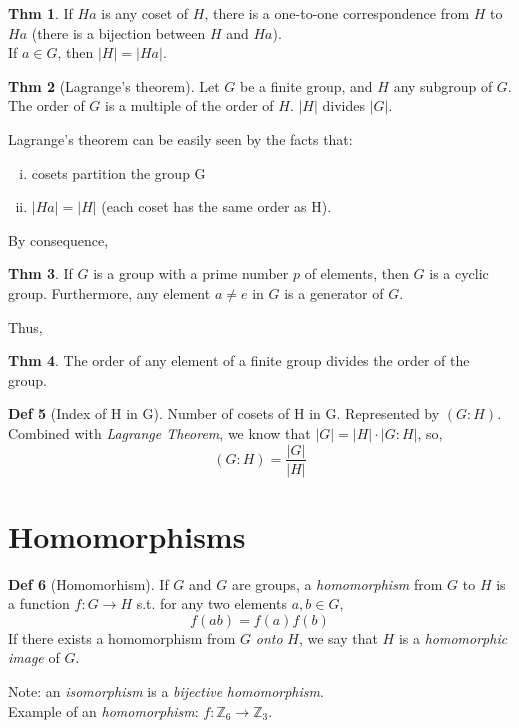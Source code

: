 \documentclass{article}
\theoremstyle{definition}
\newtheorem{definition}{Def}[section]
\newtheorem{theorem}[definition]{Thm}
\begin{document}
\begin{theorem}
    If $Ha$ is any coset of $H$, there is a one-to-one correspondence from $H$ to $Ha$ (there is a bijection between $H$ and $Ha$).\\
    If $a \in G$, then $|H| = |Ha|$.
\end{theorem}

\begin{theorem}[Lagrange's theorem]
    Let $G$ be a finite group, and $H$ any subgroup of $G$. The order of $G$ is a multiple of the order of $H$. $|H|$ divides $|G|$.
\end{theorem}
    Lagrange's theorem can be easily seen by the facts that:
    \begin{enumerate}[i.]
	\item cosets partition the group G
	\item $|Ha| = |H|$ (each coset has the same order as H). 
    \end{enumerate}

By consequence,
\begin{theorem}
    If $G$ is a group with a prime number $p$ of elements, then $G$ is a cyclic group. Furthermore, any element $a \neq e$ in $G$ is a generator of $G$.
\end{theorem}

Thus,
\begin{theorem}
    The order of any element of a finite group divides the order of the group.
\end{theorem}

\begin{definition}[Index of H in G]
    Number of cosets of H in G. Represented by $(G:H)$.\\
    Combined with \emph{Lagrange Theorem}, we know that $|G| = |H| \cdot |G:H|$, so,
    $$(G:H) = \frac{|G|}{|H|}$$
\end{definition}


\section{Homomorphisms}

\begin{definition}[Homomorhism]
    If $G$ and $G$ are groups, a \emph{homomorphism} from $G$ to $H$ is a function $f: G \rightarrow H$ s.t. for any two elements $a, b \in G$,
    $$f(ab) = f(a)f(b)$$
    If there exists a homomorphism from $G$ \emph{onto} $H$, we say that $H$ is a \emph{homomorphic image} of $G$.
\end{definition}
Note: an \emph{isomorphism} is a \emph{bijective} \emph{homomorphism}.
\\
Example of an \emph{homomorphism}: $f: \mathbb{Z}_6 \rightarrow \mathbb{Z}_3$.
\end{document}
